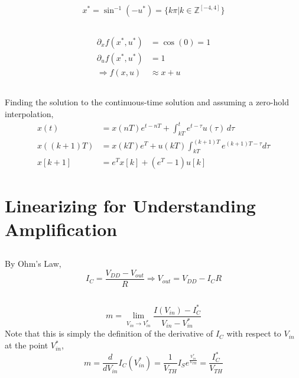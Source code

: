 \documentclass[]{article}
\newcommand{\diff}[1]{\frac{d}{d #1}}
\begin{document}
\begin{equation}
	x^{\ast} = \sin^{-1}(-u^\ast) = \{k \pi | k \in \mathbb{Z}^{[-4, 4]}\}
\end{equation}

\subsection{}

\begin{align}
	\partial_x f(x^\ast, u^\ast) &= \cos(0) = 1 \\
	\partial_u f(x^\ast, u^\ast) &= 1 \\
	\Rightarrow f(x, u) &\approx x + u
\end{align}

\subsection{}

Finding the solution to the continuous-time solution and assuming a zero-hold interpolation,
\begin{align}
	x(t) &= x(nT) e^{t - nT} + \int_{kT}^t e^{t - \tau} u(\tau) \, d\tau \\
	x((k + 1)T) &= x(kT) e^{T} + u(kT) \int_{kT}^{(k + 1)T} e^{(k + 1)T - \tau} d\tau \\
	x[k + 1] &= e^T x[k] + (e^T - 1) u[k]
\end{align}

\section{Linearizing for Understanding Amplification}

\subsection{}

By Ohm's Law,
\begin{equation}
	I_C = \frac{V_{DD} - V_{out}}{R} \Longrightarrow V_{out} = V_{DD} - I_C R
\end{equation}

\subsection{}

\begin{equation}
	m = \lim_{V_{in} \to V_{in}^\ast}\frac{I(V_{in}) - I_C^\ast}{V_{in} - V_{in}^\ast}
\end{equation}
Note that this is simply the definition of the derivative of \(I_C\) with respect to \(V_{in}\) at the point \(V_{in}^\ast\),
\begin{equation}
	m = \diff{V_{in}} I_C(V_{in}^\ast) = \frac{1}{V_{TH}} I_S e^{\frac{V_{in}^\ast}{V_{TH}}} = \frac{I_C^\ast}{V_{TH}}
\end{equation}
\end{document}
